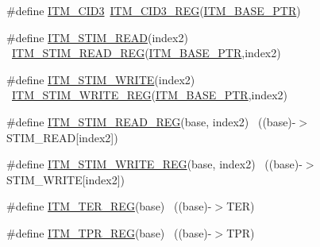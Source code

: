 \begin{DoxyCompactItemize}
\item 
\#define \hyperlink{group___i_t_m___register___accessor___macros_gafee293421dbce031defe620ccbeded36}{I\+T\+M\+\_\+\+C\+I\+D3}~\hyperlink{group___i_t_m___register___accessor___macros_gade0a6ba9d22485697b0889409b4cc976}{I\+T\+M\+\_\+\+C\+I\+D3\+\_\+\+R\+EG}(\hyperlink{group___i_t_m___peripheral_gafaddee8fe8b6a898d4e5edc43ee0d703}{I\+T\+M\+\_\+\+B\+A\+S\+E\+\_\+\+P\+TR})
\item 
\#define \hyperlink{group___i_t_m___register___accessor___macros_gae105b314bb70bc6bba676139bf20bf4c}{I\+T\+M\+\_\+\+S\+T\+I\+M\+\_\+\+R\+E\+AD}(index2)                                    ~\hyperlink{group___i_t_m___register___accessor___macros_ga5009882336aadcd4f37b45cf3395c450}{I\+T\+M\+\_\+\+S\+T\+I\+M\+\_\+\+R\+E\+A\+D\+\_\+\+R\+EG}(\hyperlink{group___i_t_m___peripheral_gafaddee8fe8b6a898d4e5edc43ee0d703}{I\+T\+M\+\_\+\+B\+A\+S\+E\+\_\+\+P\+TR},index2)
\item 
\#define \hyperlink{group___i_t_m___register___accessor___macros_gacdfde2de9665a79e3097f74bd9f3ac29}{I\+T\+M\+\_\+\+S\+T\+I\+M\+\_\+\+W\+R\+I\+TE}(index2)                                  ~\hyperlink{group___i_t_m___register___accessor___macros_ga049ca92a4e78e77c19af81e51aa73f1c}{I\+T\+M\+\_\+\+S\+T\+I\+M\+\_\+\+W\+R\+I\+T\+E\+\_\+\+R\+EG}(\hyperlink{group___i_t_m___peripheral_gafaddee8fe8b6a898d4e5edc43ee0d703}{I\+T\+M\+\_\+\+B\+A\+S\+E\+\_\+\+P\+TR},index2)
\item 
\#define \hyperlink{group___i_t_m___register___accessor___macros_ga5009882336aadcd4f37b45cf3395c450}{I\+T\+M\+\_\+\+S\+T\+I\+M\+\_\+\+R\+E\+A\+D\+\_\+\+R\+EG}(base,  index2)                  ~((base)-\/$>$S\+T\+I\+M\+\_\+\+R\+E\+AD\mbox{[}index2\mbox{]})
\item 
\#define \hyperlink{group___i_t_m___register___accessor___macros_ga049ca92a4e78e77c19af81e51aa73f1c}{I\+T\+M\+\_\+\+S\+T\+I\+M\+\_\+\+W\+R\+I\+T\+E\+\_\+\+R\+EG}(base,  index2)                ~((base)-\/$>$S\+T\+I\+M\+\_\+\+W\+R\+I\+TE\mbox{[}index2\mbox{]})
\item 
\#define \hyperlink{group___i_t_m___register___accessor___macros_ga0952675d3a89701dd186427f1c52c919}{I\+T\+M\+\_\+\+T\+E\+R\+\_\+\+R\+EG}(base)                                            ~((base)-\/$>$T\+ER)
\item 
\#define \hyperlink{group___i_t_m___register___accessor___macros_gaae645266e2d2ce5b4085486432dee954}{I\+T\+M\+\_\+\+T\+P\+R\+\_\+\+R\+EG}(base)                                            ~((base)-\/$>$T\+PR)
\item 

\end{DoxyCompactItemize}
